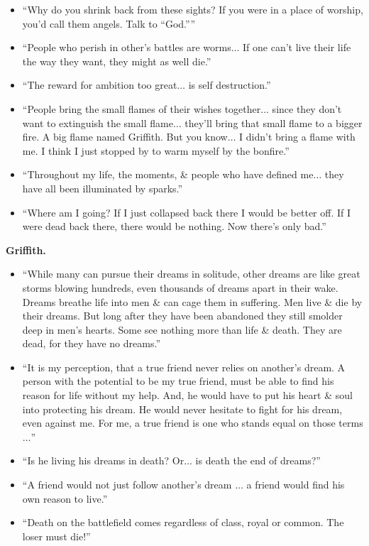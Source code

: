 \documentclass{article}
\begin{document}
\begin{enumerate}
\begin{itemize}
    	\item ``Why do you shrink back from these sights? If you were in a place of worship, you'd call them angels. Talk to ``God.''''
    	\item ``People who perish in other's battles are worms$\ldots$ If one can't live their life the way they want, they might as well die.''
    	\item ``The reward for ambition too great$\ldots$ is self destruction.''
    	\item ``People bring the small flames of their wishes together$\ldots$ since they don't want to extinguish the small flame$\ldots$ they'll bring that small flame to a bigger fire. A big flame named Griffith. But you know$\ldots$ I didn't bring a flame with me. I think I just stopped by to warm myself by the bonfire.''
    	\item ``Throughout my life, the moments, \& people who have defined me$\ldots$ they have all been illuminated by sparks.''
    	\item ``Where am I going? If I just collapsed back there I would be better off. If I were dead back there, there would be nothing. Now there's only bad.''
    \end{itemize}
	{\bf Griffith.}
	\begin{itemize}
		\item ``While many can pursue their dreams in solitude, other dreams are like great storms blowing hundreds, even thousands of dreams apart in their wake. Dreams breathe life into men \& can cage them in suffering. Men live \& die by their dreams. But long after they have been abandoned they still smolder deep in men's hearts. Some see nothing more than life \& death. They are dead, for they have no dreams.''
		\item ``It is my perception, that a true friend never relies on another's dream. A person with the potential to be my true friend, must be able to find his reason for life without my help. And, he would have to put his heart \& soul into protecting his dream. He would never hesitate to fight for his dream, even against me. For me, a true friend is one who stands equal on those terms$\ldots$''
		\item ``Is he living his dreams in death? Or$\ldots$ is death the end of dreams?''
		\item ``A friend would not just follow another's dream $\ldots$  a friend would find his own reason to live.''
		\item ``Death on the battlefield comes regardless of class, royal or common. The loser must die!''

\end{itemize}
\end{enumerate}
\end{document}

